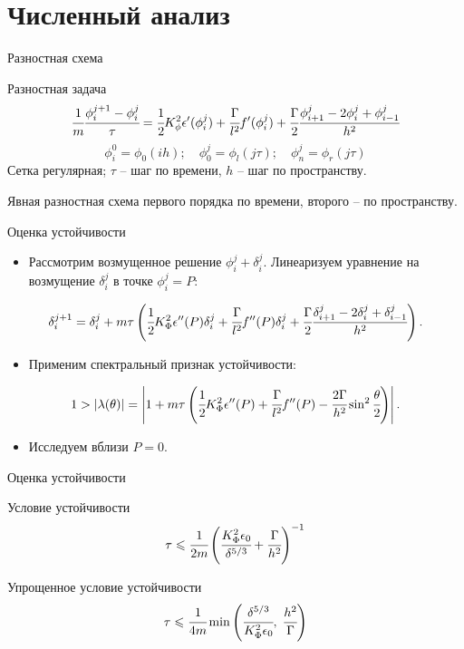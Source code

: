 \section{Численный анализ}

\begin{frame}{Разностная схема}
\begin{block}{Разностная задача}
	$$\cfrac{1}{m} \cfrac{\phi_i^{j + 1} - \phi_i^j}{\tau} = \cfrac{1}{2} K_\phi^2 \epsilon'(\phi_i^j) + \cfrac{\Gamma}{l^2} f'(\phi_i^j) + \cfrac{\Gamma}{2} \cfrac{\phi_{i + 1}^j - 2 \phi_i^j + \phi_{i - 1}^j}{h^2}$$
	$$\phi_i^0 = \phi_0(ih); \quad \phi_0^j = \phi_l(j \tau); \quad \phi_n^j = \phi_r(j \tau)$$
	Сетка регулярная; $\tau$ -- шаг по времени, $h$ -- шаг по пространству.
\end{block}
Явная разностная схема первого порядка по времени, второго -- по пространству.
\end{frame}


\begin{frame}{Оценка устойчивости}
\begin{itemize}
	\item Рассмотрим возмущенное решение $\phi_i^j + \delta_i^j$. Линеаризуем уравнение на возмущение $\delta_i^j$ в точке $\phi_i^j = P$:
\end{itemize}
$$\delta_i^{j + 1} = \delta_i^j + m \tau \left( \cfrac{1}{2} K_\Phi^2 \epsilon''(P) \delta_i^j + \cfrac{\Gamma}{l^2} f''(P) \delta_i^j + \cfrac{\Gamma}{2} \cfrac{\delta_{i + 1}^j - 2 \delta_i^j + \delta_{i - 1}^j}{h^2} \right).$$
\begin{itemize}
	\item Применим спектральный признак устойчивости:
\end{itemize}
$$1 > | \lambda(\theta) | = \left| 1 + m \tau \left( \cfrac{1}{2} K_\Phi^2 \epsilon''(P) + \cfrac{\Gamma}{l^2} f''(P) - \cfrac{2 \Gamma}{h^2} \sin^2 \cfrac{\theta}{2} \right) \right|.$$
\begin{itemize}
	\item Исследуем вблизи $P = 0$.
\end{itemize}
\end{frame}


\begin{frame}{Оценка устойчивости}
\begin{block}{Условие устойчивости}
	$$\tau \leqslant \cfrac{1}{2 m} \left( \cfrac{K_\Phi^2 \epsilon_0}{\delta^{5/3}} + \cfrac{\Gamma}{h^2} \right)^{-1}$$
\end{block}
\begin{block}{Упрощенное условие устойчивости}
	$$\tau \leqslant \cfrac{1}{4 m} \min \left(\cfrac{\delta^{5/3}}{K_\Phi^2 \epsilon_0}, \; \cfrac{h^2}{\Gamma} \right)$$
\end{block}
\end{frame}


